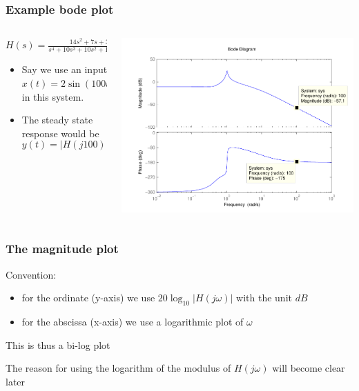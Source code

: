 \begin{frame}
\frametitle{Example bode plot}

\begin{columns}
\begin{column}{0.5\textwidth}
$H(s) = \frac{14s^2 + 7s + 3}{s^4 + 10s^3 + 10s^2 + 10s + 10}$\\
\vspace{10mm}
\begin{itemize}
\item Say we use an input $x(t) = 2\sin(100t)$ in this system.
\item The steady state response would be 
\vspace{5mm} $$y(t) = |H(j100)|\cdot 2\sin(100t + \angle H(j100))$$
\end{itemize}
\end{column}

\begin{column}{0.5\textwidth}
\includegraphics[scale=0.4]{ExampleBode1}
\end{column}

\end{columns}

\end{frame}



\begin{frame}
\frametitle{The magnitude plot}

Convention: 
\begin{itemize}
\item for the ordinate (y-axis) we use $20\log_{10}|H(j\omega)|$ with the unit $dB$
\item for the abscissa (x-axis) we use a logarithmic plot of $\omega$

\end{itemize}
This is thus a bi-log plot

The reason for using the logarithm of the modulus of $H(j\omega)$ will become clear later

\end{frame}




